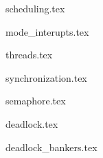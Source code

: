
{scheduling.tex}           \newpage

{mode_interupts.tex}       \newpage

{threads.tex}              \newpage

{synchronization.tex}      \newpage

{semaphore.tex}            \newpage

{deadlock.tex}            \newpage

{deadlock_bankers.tex}    \newpage
